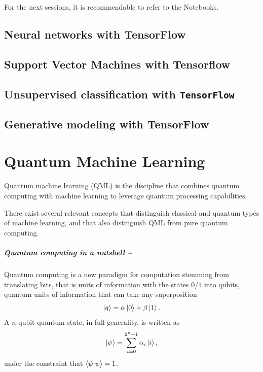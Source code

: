 \documentclass[]{report}
\begin{document}
For the next sessions, it is recommendable to refer to the Notebooks. 

\section{Neural networks with TensorFlow}

\section{Support Vector Machines with Tensorflow}

\section{Unsupervised classification with \texttt{TensorFlow}}

\section{Generative modeling with TensorFlow}

\chapter{Quantum Machine Learning}

Quantum machine learning (QML) is the discipline that combines quantum computing with machine learning to leverage quantum processing capabilities. 

There exist several relevant concepts that distinguish classical and quantum types of machine learning, and that also distinguish QML from pure quantum computing. 

\paragraph{Quantum computing in a nutshell --} Quantum computing is a new paradigm for computation stemming from translating bits, that is units of information with the states $0 / 1$ into qubits, quantum units of information that can take any superposition 
\begin{equation}
\ket q = \alpha\ket 0 + \beta\ket 1.
\end{equation}
A $n$-qubit quantum state, in full generality, is written as
\begin{equation}
\ket\psi = \sum_{i = 0}^{2^n - 1} \alpha_i \ket i, 
\end{equation}
under the constraint that $\braket{\psi}{\psi} = 1$. 
\end{document}
